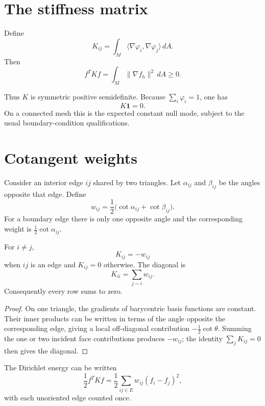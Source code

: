\section{The stiffness matrix}

\begin{definition}\label{def:vii41-stiffness}
Define
\[
K_{ij}=\int_M\langle\nabla\varphi_i,\nabla\varphi_j\rangle\,dA.
\]
Then
\[
f^T K f=\int_M\|\nabla f_h\|^2\,dA\ge0.
\]
\end{definition}

Thus \(K\) is symmetric positive semidefinite.  Because
\(\sum_i\varphi_i=1\), one has
\[
K\mathbf 1=0.
\]
On a connected mesh this is the expected constant null mode, subject to the
usual boundary-condition qualifications.

\section{Cotangent weights}

Consider an interior edge \(ij\) shared by two triangles.  Let \(\alpha_{ij}\)
and \(\beta_{ij}\) be the angles opposite that edge.  Define
\[
w_{ij}=\frac12\bigl(\cot\alpha_{ij}+\cot\beta_{ij}\bigr).
\]
For a boundary edge there is only one opposite angle and the corresponding
weight is \(\tfrac12\cot\alpha_{ij}\).

\begin{theorem}\label{thm:vii41-cotan}
For \(i\ne j\),
\[
K_{ij}=-w_{ij}
\]
when \(ij\) is an edge and \(K_{ij}=0\) otherwise.  The diagonal is
\[
K_{ii}=\sum_{j\sim i}w_{ij}.
\]
Consequently every row sums to zero.
\end{theorem}

\begin{proof}
On one triangle, the gradients of barycentric basis functions are constant.
Their inner products can be written in terms of the angle opposite the
corresponding edge, giving a local off-diagonal contribution
\(-\tfrac12\cot\theta\).  Summing the one or two incident face contributions
produces \(-w_{ij}\); the identity \(\sum_jK_{ij}=0\) then gives the diagonal.
\end{proof}

\begin{proposition}\label{prop:vii41-edge-energy}
The Dirichlet energy can be written
\[
\frac12 f^T Kf
=
\frac12\sum_{ij\in E} w_{ij}(f_i-f_j)^2,
\]
with each unoriented edge counted once.
\end{proposition}


